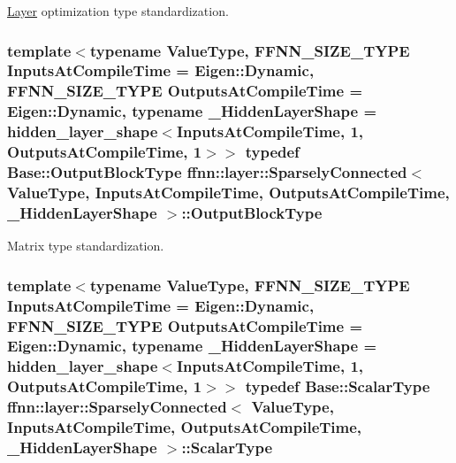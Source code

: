 \hyperlink{classffnn_1_1layer_1_1_layer}{Layer} optimization type standardization. 

\hypertarget{classffnn_1_1layer_1_1_sparsely_connected_acf74c21ad0bae12c595065447bdc740a}{
\subsubsection[{Output\-Block\-Type}]{\setlength{\rightskip}{0pt plus 5cm}template$<$typename Value\-Type, F\-F\-N\-N\-\_\-\-S\-I\-Z\-E\-\_\-\-T\-Y\-P\-E Inputs\-At\-Compile\-Time = Eigen\-::\-Dynamic, F\-F\-N\-N\-\_\-\-S\-I\-Z\-E\-\_\-\-T\-Y\-P\-E Outputs\-At\-Compile\-Time = Eigen\-::\-Dynamic, typename \-\_\-\-Hidden\-Layer\-Shape = hidden\-\_\-layer\-\_\-shape$<$\-Inputs\-At\-Compile\-Time, 1, Outputs\-At\-Compile\-Time, 1$>$$>$ typedef Base\-::\-Output\-Block\-Type {\bf ffnn\-::layer\-::\-Sparsely\-Connected}$<$ Value\-Type, Inputs\-At\-Compile\-Time, Outputs\-At\-Compile\-Time, \-\_\-\-Hidden\-Layer\-Shape $>$\-::{\bf Output\-Block\-Type}}}\label{classffnn_1_1layer_1_1_sparsely_connected_acf74c21ad0bae12c595065447bdc740a}


Matrix type standardization. 

\hypertarget{classffnn_1_1layer_1_1_sparsely_connected_ab9a48a183f4883c21290997ff05e7e7d}{
\subsubsection[{Scalar\-Type}]{\setlength{\rightskip}{0pt plus 5cm}template$<$typename Value\-Type, F\-F\-N\-N\-\_\-\-S\-I\-Z\-E\-\_\-\-T\-Y\-P\-E Inputs\-At\-Compile\-Time = Eigen\-::\-Dynamic, F\-F\-N\-N\-\_\-\-S\-I\-Z\-E\-\_\-\-T\-Y\-P\-E Outputs\-At\-Compile\-Time = Eigen\-::\-Dynamic, typename \-\_\-\-Hidden\-Layer\-Shape = hidden\-\_\-layer\-\_\-shape$<$\-Inputs\-At\-Compile\-Time, 1, Outputs\-At\-Compile\-Time, 1$>$$>$ typedef {\bf Base\-::\-Scalar\-Type} {\bf ffnn\-::layer\-::\-Sparsely\-Connected}$<$ Value\-Type, Inputs\-At\-Compile\-Time, Outputs\-At\-Compile\-Time, \-\_\-\-Hidden\-Layer\-Shape $>$\-::{\bf Scalar\-Type}}}\label{classffnn_1_1layer_1_1_sparsely_connected_ab9a48a183f4883c21290997ff05e7e7d}


